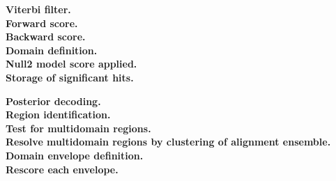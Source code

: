 \begin{description}
 
 
 
 







 


 
 


  

\item[\textbf{Viterbi filter.}]

\item[\textbf{Forward score.}]

\item[\textbf{Backward score.}]

\item[\textbf{Domain definition.}]

\item[\textbf{Null2 model score applied.}]

\item[\textbf{Storage of significant hits.}]
\end{description}



\begin{description}
\item[\textbf{Posterior decoding.}]

\item[\textbf{Region identification.}]

\item[\textbf{Test for multidomain regions.}]

\item[\textbf{Resolve multidomain regions by clustering of alignment ensemble.}]

\item[\textbf{Domain envelope definition.}]

\item[\textbf{Rescore each envelope.}]
\end{description}


